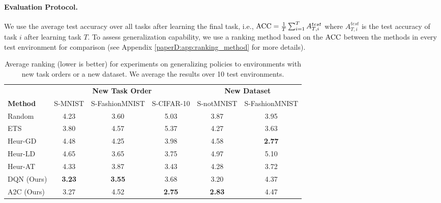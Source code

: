 \vspace{-2mm}
\paragraph{Evaluation Protocol.} We use the average test accuracy over all tasks after learning the final task, i.e., ${\text{ACC}} = \frac{1}{T} \sum_{i=1}^{T} A_{T, i}^{test}$ where $A_{T, i}^{test}$ is the test accuracy of task $i$ after learning task $T$. 
To assess generalization capability, we use a ranking method based on the ${\text{ACC}}$ between the methods in every test environment for comparison (see Appendix \ref{paperD:app:ranking_method} for more details). 



\begin{table}[t]
	\footnotesize%
	\centering
	\caption{Average ranking (lower is better) for experiments on generalizing policies to environments with new task orders or a new dataset. %
		We average the results over 10 test environments. %
	}
	\label{tab:average_ranking_rl_experiment}
		\begin{tabular}{l c c c c c}
			\toprule %
			& \multicolumn{3}{c}{ {\bf New Task Order}} & \multicolumn{2}{c}{ {\bf New Dataset}}\\
			\cmidrule(lr){2-4}  \cmidrule(lr){5-6}
			{\bf Method} & S-MNIST & S-FashionMNIST & S-CIFAR-10 & S-notMNIST & S-FashionMNIST  \\ 
			\midrule
			Random         & 4.23   & 3.60 & 5.03 & 3.87 & 3.95\\ 
			ETS            & 3.80 & 4.57 & 5.37 & 4.27 & 3.63 \\
			\midrule 
			Heur-GD        & 4.48 & 4.25 & 3.98 & 4.58 & {\bf 2.77} \\
			Heur-LD        & 4.65 & 3.65 & 3.75 & 4.97 & 5.10 \\
			Heur-AT        & 4.33 & 3.87 & 3.43 & 4.28 & 3.72 \\
			\midrule
			DQN (Ours)     & {\bf 3.23} & {\bf 3.55} & 3.68 & 3.20 & 4.37 \\
			A2C (Ours)     & 3.27 & 4.52 & {\bf 2.75} & {\bf 2.83} & 4.47 \\
			\bottomrule %
		\end{tabular}
	\vspace{-2mm}
\end{table}


